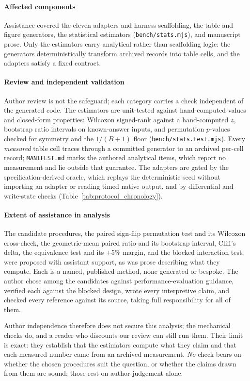 \documentclass[11pt,a4paper]{article}
\begin{document}
\paragraph{Affected components} Assistance covered the eleven adapters and harness scaffolding, the
table and figure generators, the statistical estimators (\texttt{bench/stats.mjs}), and manuscript
prose. Only the estimators carry analytical rather than scaffolding logic: the generators
deterministically transform archived records into table cells, and the adapters satisfy a fixed
contract.

\paragraph{Review and independent validation} Author review is not the safeguard; each category
carries a check independent of the generated code. The estimators are unit-tested against
hand-computed values and closed-form properties: Wilcoxon signed-rank against a hand-computed $z$,
bootstrap ratio intervals on known-answer inputs, and permutation $p$-values checked for symmetry
and the $1/(B+1)$ floor (\texttt{bench/stats.test.mjs}). Every \emph{measured} table cell traces
through a committed generator to an archived per-cell record; \texttt{MANIFEST.md} marks the
authored analytical items, which report no measurement and lie outside that guarantee. The adapters
are gated by the specification-derived oracle, which replays the deterministic seed without
importing an adapter or reading timed native output, and by differential and write-state checks
(Table~\ref{tab:protocol_chronology}).

\paragraph{Extent of assistance in analysis} The candidate procedures, the paired sign-flip
permutation test and its Wilcoxon cross-check, the geometric-mean paired ratio and its bootstrap
interval, Cliff's delta, the equivalence test and its $\pm5\%$ margin, and the blocked interaction
test, were proposed with assistant support, as was prose describing what they compute. Each is a
named, published method, none generated or bespoke. The author chose among the candidates against
performance-evaluation guidance, verified each against the blocked design, wrote every interpretive
claim, and checked every reference against its source, taking full responsibility for all of them.

Author independence therefore does not secure this analysis; the mechanical checks do, and a reader
who discounts our review can still run them. Their limit is exact: they establish that the
estimators compute what they claim and that each measured number came from an archived measurement.
\emph{No} check bears on whether the chosen procedures suit the question, or whether the claims
drawn from them are sound; those rest on author judgement alone.
\end{document}
